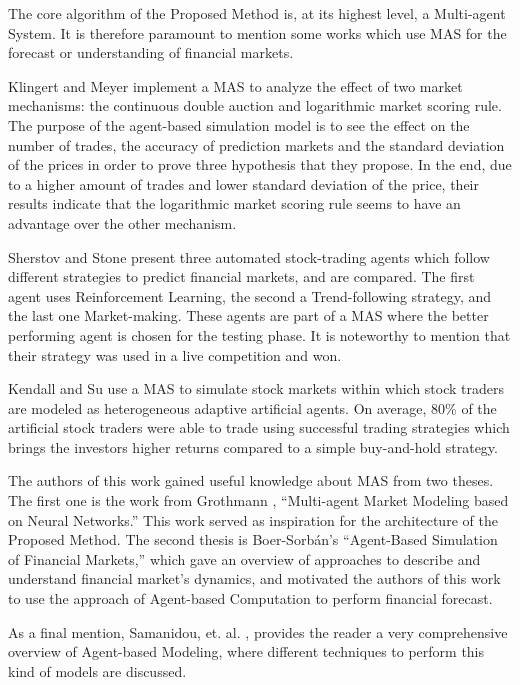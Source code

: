 \documentclass[12pt,journal,draftcls,onecolumn]{IEEEtran}
\begin{document}
The core algorithm of the Proposed Method is, at its highest level, a Multi-agent System. It is therefore paramount to mention some works which use MAS for the forecast or understanding of financial markets.

Klingert and Meyer \cite{Klingert_2012} implement a MAS to analyze the effect of two market mechanisms: the continuous double auction and logarithmic market scoring rule. The purpose of the agent-based simulation model is to see the effect on the number of trades, the accuracy of prediction markets and the standard deviation of the prices in order to prove three hypothesis that they propose. In the end, due to a higher amount of trades and lower standard deviation of the price, their results indicate that the logarithmic market scoring rule seems to have an advantage over the other mechanism.

Sherstov and Stone \cite{Sherstov2005} present three automated stock-trading agents which follow different strategies to predict financial markets, and are compared. The first agent uses Reinforcement Learning, the second a Trend-following strategy, and the last one Market-making. These agents are part of a MAS where the better performing agent is chosen for the testing phase. It is noteworthy to mention that their strategy was used in a live competition and won.

Kendall and Su \cite{Kendall2003} use a MAS to simulate stock markets within which stock traders are modeled as heterogeneous adaptive artificial agents. On average, 80\% of the artificial stock traders were able to trade using successful trading strategies which brings the investors higher returns compared to a simple buy-and-hold strategy.

The authors of this work gained useful knowledge about MAS from two theses. The first one is the work from Grothmann \cite{Grothmann2002}, ``Multi-agent Market Modeling based on Neural Networks.'' This work served as inspiration for the architecture of the Proposed Method. The second thesis is Boer-Sorb{\'{a}}n's ``Agent-Based Simulation of Financial Markets,'' which gave an overview of approaches to describe and understand financial market's dynamics, and motivated the authors of this work to use the approach of Agent-based Computation to perform financial forecast.

As a final mention, Samanidou, et. al. \cite{Samanidou_2007}, provides the reader a very comprehensive overview of Agent-based Modeling, where different techniques to perform this kind of models are discussed.
\end{document}
